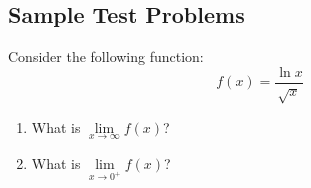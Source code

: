 \subsection{Sample Test Problems}
\begin{exercise}{\Coffeecup \Coffeecup \Coffeecup}
 Consider the following function: $$ f(x)=\frac{\ln{x}}{\sqrt{x}}$$
\begin{enumerate}[label=\alph*.)]
\item What is $\lim \limits_{x\rightarrow \infty}f(x)$?
\item What is $\lim\limits_{x\rightarrow 0^+}f(x)$?


\end{enumerate}
\end{exercise}
